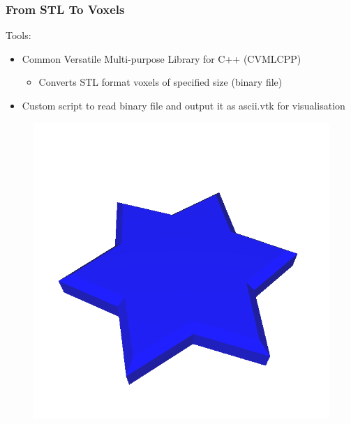 \begin{frame}
		\frametitle{From STL To Voxels}
		\begin{minipage}{0.85\textwidth}
			Tools:
			\begin{itemize}
			\item Common Versatile Multi-purpose Library for C++ (CVMLCPP)
				\begin{itemize}			
				\item Converts STL format voxels of specified size (binary file)
				\end{itemize}
			\item Custom script to read binary file and output it as ascii.vtk for visualisation
			\end{itemize}
			\centering
			\begin{figure}
			\includegraphics[scale=0.15]{Pictures/STLToVoxels/Star_STL.png}

\end{figure}
\end{minipage}
\end{frame}
